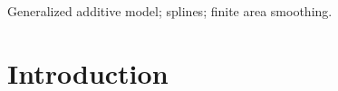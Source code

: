 \documentclass[useAMS, referee]{biom}
\begin{document}
%

\begin{keywords}
Generalized additive model; splines; finite area smoothing.
\end{keywords}


\maketitle



%
\section{Introduction \label{IN}}
\end{document}
